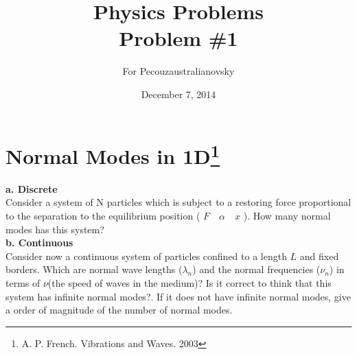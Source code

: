 \documentclass{article}
\begin{document}
\title{Physics Problems\\ Problem \#1}

\author{For Pecouzaustralianovsky}

\date{December 7, 2014}
\maketitle


\section*{Normal Modes in 1D\footnote{A. P. French. Vibrations and Waves. 2003}}

\textbf{a. Discrete}\\

Consider a system of N particles which is subject to a restoring force proportional to the separation to the equilibrium position ( $F \quad \alpha \quad x$ ). How many normal modes has this system?\\

\textbf{b. Continuous }\\

Consider now a continuous system of particles confined to a length $L$ and fixed borders. Which are normal wave lengths ($\lambda_n$) and the normal frequencies ($\nu_n$) in terms of $\nu$(the speed of waves in the medium)? Is it correct to think that this system has infinite normal modes?. If it does not have infinite normal modes, give a order of magnitude of the number of normal modes.
\end{document}

